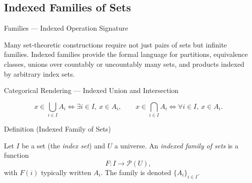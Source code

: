 
\subsection{Indexed Families of Sets}


\begin{lratopiccard}{Families --- Indexed Operation Signature}
\begin{lrasignaturetable}
\end{lrasignaturetable}
\end{lratopiccard}

\begin{remark*}[Exposition]
Many set-theoretic constructions require not just pairs of sets but
infinite families. Indexed families provide the formal language for
partitions, equivalence classes, unions over countably or uncountably many
sets, and products indexed by arbitrary index sets.
\end{remark*}

\begin{lracategoricalcard}{Categorical Rendering --- Indexed Union and Intersection}
\begin{center}

\end{center}
\[
  x\in\bigcup_{i\in I}A_i \Longleftrightarrow \exists i\in I,\ x\in A_i,
  \qquad
  x\in\bigcap_{i\in I}A_i \Longleftrightarrow \forall i\in I,\ x\in A_i.
\]
\end{lracategoricalcard}

\begin{definitionbox}{Definition (Indexed Family of Sets)}
\begin{definition}\label{def:indexed-family}
Let $I$ be a set (the \emph{index set}) and $U$ a universe. An
\emph{indexed family of sets} is a function
\[
F : I \to \mathcal{P}(U),
\]
with $F(i)$ typically written $A_i$. The family is denoted $\{A_i\}_{i \in I}$.
\end{definition}
\end{definitionbox}

